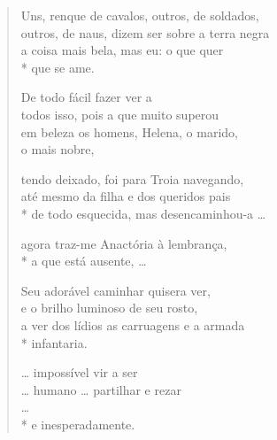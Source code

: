\begin{verse}
Uns, renque de cavalos, outros, de soldados,\\
outros, de naus, dizem ser sobre a terra negra\\
a coisa mais bela, mas eu: o que quer\\*
que se ame.

De todo fácil fazer ver a\\
todos isso, pois a que muito superou\\			
em beleza os homens, Helena, o marido, \\
o mais nobre,

tendo deixado, foi para Troia navegando,\\
até mesmo da filha e dos queridos pais\\*
de todo esquecida, mas desencaminhou-a \ldots{}

agora traz-me Anactória à lembrança,\\*
a que está ausente, \ldots{}

Seu adorável caminhar quisera ver,\\
e o brilho luminoso de seu rosto,\\
a ver dos lídios as carruagens e a armada\\*
infantaria.

\ldots{} impossível vir a ser\\
\ldots{} humano \ldots{} partilhar e rezar\\
\ldots{}\\*
e inesperadamente.
\end{verse}

\pagebreak

